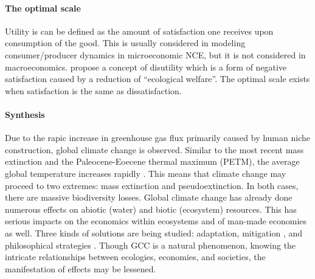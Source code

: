 \paragraph{The optimal scale}
Utility is can be defined as the amount of satisfaction one receives upon consumption of the good.
This is usually considered in modeling consumer/producer dynamics in microeconomic NCE, but it is not considered in macroeconomics.
 propose a concept of disutility which is a form of negative satisfaction caused by a reduction of ``ecological welfare''.
The optimal scale exists when satisfaction is the same as dissatisfaction.

\paragraph{Synthesis}
Due to the rapic increase in greenhouse gas flux primarily caused by human niche construction, global climate change is observed.
Similar to the most recent mass extinction and the Paleocene-Eoecene thermal maximum (PETM), the average global temperature increases rapidly \cite{Keller2018}.
This means that climate change may proceed to two extremes: mass extinction and pseudoextinction.
In both cases, there are massive biodiversity losses.
Global climate change has already done numerous effects on abiotic (water) and biotic (ecosystem) resources.
This has serious impacts on the economics within ecosystems and of man-made economies as well.
Three kinds of solutions are being studied: adaptation, mitigation \cite{overclim}, and philosophical strategies \cite{daly}.
Though GCC is a natural phenomenon, knowing the intricate relationships between ecologies, economies, and societies, the manifestation of effects may be lessened.
